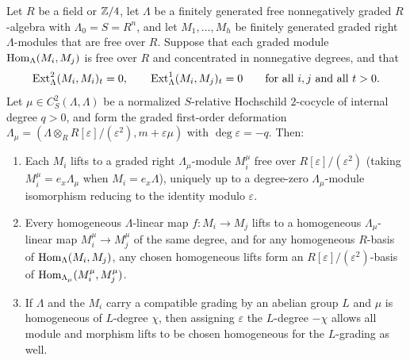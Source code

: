 \begin{lemma}
\label{lem:square-zero-selected-lifts}
Let $R$ be a field or $\mathbb Z/4$, let $\Lambda$ be a finitely generated free
nonnegatively graded $R$-algebra with $\Lambda_0=S=R^n$, and let
$M_1,\ldots,M_h$ be finitely generated graded right $\Lambda$-modules that
are free over $R$. Suppose that each graded module $\operatorname{Hom}_\Lambda(M_i,M_j)$ is
free over $R$ and concentrated in nonnegative degrees, and that
\[
 \operatorname{Ext}^2_\Lambda(M_i,M_i)_t=0,\qquad
 \operatorname{Ext}^1_\Lambda(M_i,M_j)_t=0\qquad\text{for all }i,j\text{ and all }t>0.
\]
Let $\mu\in C^2_S(\Lambda,\Lambda)$ be a normalized $S$-relative Hochschild
$2$-cocycle of internal degree $q>0$, and form the graded first-order
deformation
$\Lambda_\mu=(\Lambda\otimes_R R[\varepsilon]/(\varepsilon^2),m+\varepsilon\mu)$
with $\deg\varepsilon=-q$. Then:
\begin{enumerate}[label={\upshape(\arabic*)}]
\item Each $M_i$ lifts to a graded right $\Lambda_\mu$-module $M_i^\mu$ free
over $R[\varepsilon]/(\varepsilon^2)$ (taking $M_i^\mu=e_x\Lambda_\mu$ when
$M_i=e_x\Lambda$), uniquely up to a degree-zero $\Lambda_\mu$-module
isomorphism reducing to the identity modulo $\varepsilon$.
\item Every homogeneous $\Lambda$-linear map $f:M_i\to M_j$ lifts to a
homogeneous $\Lambda_\mu$-linear map $M_i^\mu\to M_j^\mu$ of the same degree,
and for any homogeneous $R$-basis of $\operatorname{Hom}_\Lambda(M_i,M_j)$, any chosen
homogeneous lifts form an $R[\varepsilon]/(\varepsilon^2)$-basis of
$\operatorname{Hom}_{\Lambda_\mu}(M_i^\mu,M_j^\mu)$.
\item If $\Lambda$ and the $M_i$ carry a compatible grading by an abelian
group $L$ and $\mu$ is homogeneous of $L$-degree $\chi$, then assigning
$\varepsilon$ the $L$-degree $-\chi$ allows all module and morphism lifts to
be chosen homogeneous for the $L$-grading as well.
\end{enumerate}
\end{lemma}
